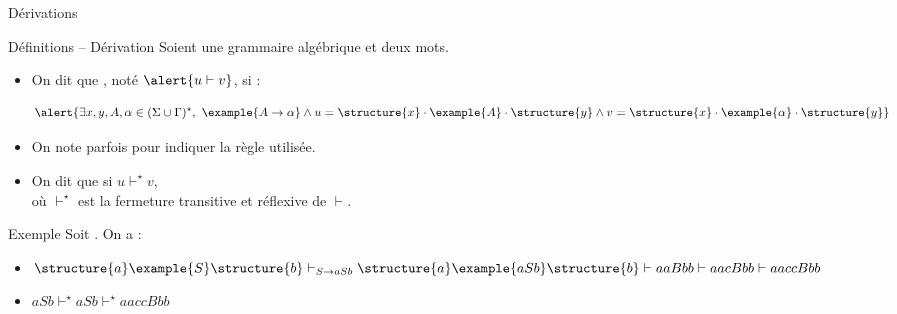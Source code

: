 
\begingroup

\begin{frame}{Dérivations}

  \begin{block}{Définitions -- Dérivation}
    Soient  une grammaire algébrique et  deux mots. 

    \begin{itemize}
    \item On dit que , noté $\alert{u \vdash v}$, si :

      $$\alert{\exists x, y, A, \alpha \in (\Sigma \cup \Gamma)^\star,~
        \example{A \rightarrow \alpha} \land u = \structure{x} \cdot \example{A} \cdot \structure{y} \land v = \structure{x} \cdot \example{\alpha} \cdot \structure{y}}$$

    \item On note parfois  pour indiquer la règle utilisée.

    \item On dit que  si \alert{$u \vdash^\star v$},\\
      où \alert{$\vdash^\star$ est la fermeture transitive et réflexive de $\vdash$}.

    \end{itemize}
  \end{block}

  \begin{exampleblock}{Exemple}
    Soit . On a :

    \vspace{2mm}
    \begin{itemize}
    \item $\structure{a}\example{S}\structure{b} \vdash_{S \rightarrow aSb} \structure{a}\example{aSb}\structure{b} \vdash aaBbb \vdash aacBbb \vdash aaccBbb$
    \item $aSb \vdash^\star aSb \vdash^\star aaccBbb$
    \end{itemize}
  \end{exampleblock}

\end{frame}

\endgroup
\endinput
